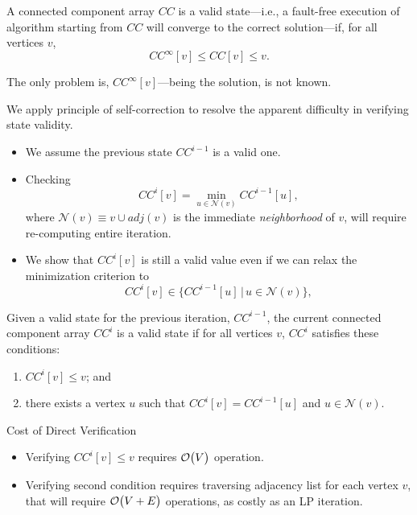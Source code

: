 \begin{theorem}

A connected component array $CC$ is a valid state---i.e.,
a fault-free execution of algorithm  starting from $CC$ will converge to the correct solution---if, for all vertices $v$, 
\[ CC^{\infty}[v] \leq CC[v] \leq v.
\]

\end{theorem} 

\centering 
\color{red} The only problem is, $CC^{\infty}[v]$---being the solution, is not known. 

\lyxframeend{}

We apply principle of self-correction to resolve the apparent difficulty in verifying state validity.
\begin{itemize}
\item<2-> We assume the previous state $CC^{i-1}$ is a valid one.
\item<3-> Checking 
\[ CC^{i}[v] = \min_{u \in \mathcal{N}(v)} CC^{i-1}[u], \]
 where  $\mathcal{N}(v) \equiv v \cup adj(v)$ is the immediate \emph{neighborhood} of $v$, {\color{red} will require re-computing entire iteration.}
\item<4-> We show that $CC^{i}[v]$ is still a valid value even if we can relax the minimization criterion to
\[
CC^{i}[v] \in \{ CC^{i-1}[u] \, | \, u \in \mathcal{N}(v) \}, %
\] 

\end{itemize}

\lyxframeend{}

\begin{theorem}
Given a valid state for the previous iteration, $CC^{i-1}$, the current connected component array $CC^{i}$ is a valid state if for all vertices $v$, $CC^{i}$ satisfies these conditions:
\begin{enumerate}
\item $CC^{i}[v] \leq v$; and
\item there exists a vertex $u$ such that $CC^{i}[v]=CC^{i-1}[u]$ and $u \in \mathcal{N}(v)$. %
\end{enumerate}
\end{theorem}

\pause
\begin{block}{ Cost of Direct Verification}
\begin{itemize}
\item Verifying $CC^{i}[v] \leq v$ requires $\operatorname{\mathcal{O}}\bigl({V}\bigr)$ operation.
\item Verifying second condition requires traversing adjacency list for each vertex $v$, that will require
$\operatorname{\mathcal{O}}\bigl({V+E}\bigr)$ operations, \color{red} as costly as an LP iteration.
\end{itemize}

\end{block}


